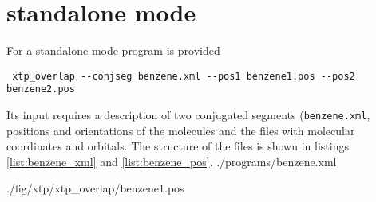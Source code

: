 
\chapter{\xtp standalone mode}
\label{sec:xtp_standalone}

For a standalone mode program \overlap is provided 
\begin{verbatim}
 xtp_overlap --conjseg benzene.xml --pos1 benzene1.pos --pos2 benzene2.pos
\end{verbatim}
Its input requires a description of two conjugated segments (\texttt{benzene.xml}, positions and orientations of the molecules and the files with molecular coordinates and orbitals. The structure of the files is shown in listings \ref{list:benzene_xml} and  \ref{list:benzene_pos}.
\vskip 0.1cm
 {./programs/benzene.xml}

\vskip 0.1cm

 {./fig/xtp/xtp_overlap/benzene1.pos}

